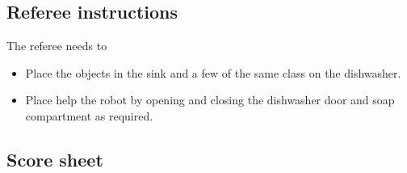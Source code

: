 \subsection{Referee instructions}
The referee needs to
\begin{itemize}
	\item Place the objects in the sink and a few of the same class on the dishwasher. 
	\item Place help the robot by opening and closing the dishwasher door and soap compartment as required. 
\end{itemize}


\newpage
\subsection{Score sheet}


